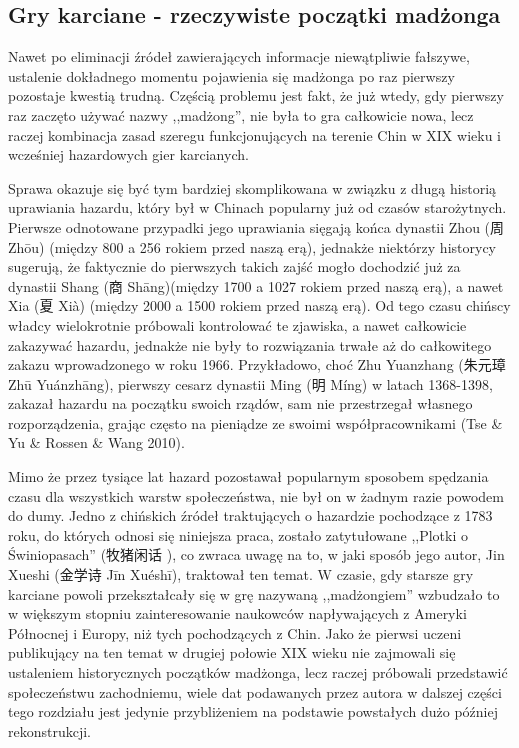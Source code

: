 \subsection{Gry karciane - rzeczywiste początki madżonga}
Nawet po eliminacji źródeł zawierających informacje niewątpliwie fałszywe,
ustalenie dokładnego momentu pojawienia się madżonga po raz pierwszy pozostaje
kwestią trudną. Częścią problemu jest fakt, że już wtedy, gdy pierwszy raz
zaczęto używać nazwy ,,madżong'', nie była to gra całkowicie nowa, lecz raczej
kombinacja zasad szeregu funkcjonujących na terenie Chin w XIX wieku i wcześniej
hazardowych gier karcianych. 

Sprawa okazuje się być tym bardziej skomplikowana w związku z długą historią
uprawiania hazardu, który był w Chinach popularny już od czasów starożytnych.
Pierwsze odnotowane przypadki jego uprawiania sięgają końca dynastii Zhou (周
Zhōu) (między 800 a 256 rokiem przed naszą erą), jednakże niektórzy historycy
sugerują, że faktycznie do pierwszych takich zajść mogło dochodzić już za
dynastii Shang (商 Shāng)(między 1700 a 1027 rokiem przed naszą erą), a nawet Xia
(夏 Xià) (między 2000 a 1500 rokiem przed naszą erą). Od tego czasu chińscy
władcy wielokrotnie próbowali kontrolować te zjawiska, a nawet całkowicie
zakazywać hazardu, jednakże nie były to rozwiązania trwałe aż do całkowitego
zakazu wprowadzonego w roku 1966. Przykładowo, choć Zhu Yuanzhang (朱元璋 Zhū
Yuánzhāng), pierwszy cesarz dynastii Ming (明 Míng) w latach 1368-1398, zakazał
hazardu na początku swoich rządów, sam nie przestrzegał własnego rozporządzenia,
grając często na pieniądze ze swoimi współpracownikami (Tse \& Yu \& Rossen \&
Wang 2010).

Mimo że przez tysiące lat hazard pozostawał popularnym sposobem spędzania czasu
dla wszystkich warstw społeczeństwa, nie był on w żadnym razie powodem do dumy.
Jedno z chińskich źródeł traktujących o hazardzie pochodzące z 1783 roku, do
których odnosi się niniejsza praca, zostało zatytułowane ,,Plotki o
Świniopasach'' (牧猪闲话 ), co zwraca uwagę na to, w jaki
sposób jego autor, Jin Xueshi (金学诗 Jīn Xuéshī), traktował ten temat.  W czasie,
gdy starsze gry karciane powoli przekształcały się w grę nazywaną ,,madżongiem''
wzbudzało to w większym stopniu zainteresowanie naukowców napływających z
Ameryki Północnej i Europy, niż tych pochodzących z Chin. Jako że pierwsi uczeni
publikujący na ten temat w drugiej połowie XIX wieku nie zajmowali się
ustaleniem historycznych początków madżonga, lecz raczej próbowali przedstawić
społeczeństwu zachodniemu, wiele dat podawanych przez autora w dalszej części
tego rozdziału jest jedynie przybliżeniem na podstawie powstałych dużo później
rekonstrukcji.

